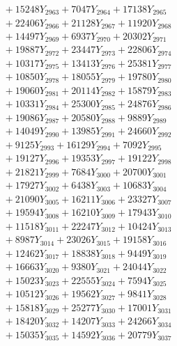 \documentclass[a4paper,10pt]{article}
\begin{document}
{\begin{align}
&\;  + 15248 Y_{2963} + 7047 Y_{2964} + 17138 Y_{2965} \\[0.3ex]
&\;  + 22406 Y_{2966} + 21128 Y_{2967} + 11920 Y_{2968} \\[0.5ex]\allowbreak
&\;  + 14497 Y_{2969} + 6937 Y_{2970} + 20302 Y_{2971} \\[0.3ex]
&\;  + 19887 Y_{2972} + 23447 Y_{2973} + 22806 Y_{2974} \\[0.3ex]
&\;  + 10317 Y_{2975} + 13413 Y_{2976} + 25381 Y_{2977} \\[0.3ex]
&\;  + 10850 Y_{2978} + 18055 Y_{2979} + 19780 Y_{2980} \\[0.3ex]
&\;  + 19060 Y_{2981} + 20114 Y_{2982} + 15879 Y_{2983} \\[0.3ex]
&\;  + 10331 Y_{2984} + 25300 Y_{2985} + 24876 Y_{2986} \\[0.3ex]
&\;  + 19086 Y_{2987} + 20580 Y_{2988} + 9889 Y_{2989} \\[0.3ex]
&\;  + 14049 Y_{2990} + 13985 Y_{2991} + 24660 Y_{2992} \\[0.3ex]
&\;  + 9125 Y_{2993} + 16129 Y_{2994} + 7092 Y_{2995} \\[0.3ex]
&\;  + 19127 Y_{2996} + 19353 Y_{2997} + 19122 Y_{2998} \\[0.5ex]\allowbreak
&\;  + 21821 Y_{2999} + 7684 Y_{3000} + 20700 Y_{3001} \\[0.3ex]
&\;  + 17927 Y_{3002} + 6438 Y_{3003} + 10683 Y_{3004} \\[0.3ex]
&\;  + 21090 Y_{3005} + 16211 Y_{3006} + 23327 Y_{3007} \\[0.3ex]
&\;  + 19594 Y_{3008} + 16210 Y_{3009} + 17943 Y_{3010} \\[0.3ex]
&\;  + 11518 Y_{3011} + 22247 Y_{3012} + 10424 Y_{3013} \\[0.3ex]
&\;  + 8987 Y_{3014} + 23026 Y_{3015} + 19158 Y_{3016} \\[0.3ex]
&\;  + 12462 Y_{3017} + 18838 Y_{3018} + 9449 Y_{3019} \\[0.3ex]
&\;  + 16663 Y_{3020} + 9380 Y_{3021} + 24044 Y_{3022} \\[0.3ex]
&\;  + 15023 Y_{3023} + 22555 Y_{3024} + 7594 Y_{3025} \\[0.3ex]
&\;  + 10512 Y_{3026} + 19562 Y_{3027} + 9841 Y_{3028} \\[0.5ex]\allowbreak
&\;  + 15818 Y_{3029} + 25277 Y_{3030} + 17001 Y_{3031} \\[0.3ex]
&\;  + 18420 Y_{3032} + 14207 Y_{3033} + 24266 Y_{3034} \\[0.3ex]
&\;  + 15035 Y_{3035} + 14592 Y_{3036} + 20779 Y_{3037} \\[0.3ex]

\end{align}}
\end{document}
